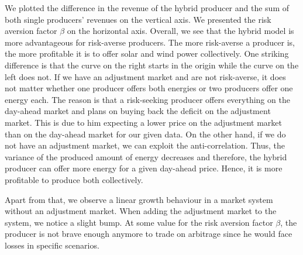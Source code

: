 We plotted the difference in the revenue of the hybrid producer and the sum of both single producers' revenues on the vertical axis. We presented the risk aversion factor $\beta$ on the horizontal axis. Overall, we see that the hybrid model is more advantageous for risk-averse producers. The more risk-averse a producer is, the more profitable it is to offer solar and wind power collectively. One striking difference is that the curve on the right starts in the origin while the curve on the left does not. If we have an adjustment market and are not risk-averse, it does not matter whether one producer offers both energies or two producers offer one energy each. The reason is that a risk-seeking producer offers everything on the day-ahead market and plans on buying back the deficit on the adjustment market. This is due to him expecting a lower price on the adjustment market than on the day-ahead market for our given data.
On the other hand, if we do not have an adjustment market, we can exploit the anti-correlation. Thus, the variance of the produced amount of energy decreases and therefore, the hybrid producer can offer more energy for a given day-ahead price. Hence, it is more profitable to produce both collectively. 

Apart from that, we observe a linear growth behaviour in a market system without an adjustment market. When adding the adjustment market to the system, we notice a slight bump. At some value for the risk aversion factor $\beta$, the producer is not brave enough anymore to trade on arbitrage since he would face losses in specific scenarios. 